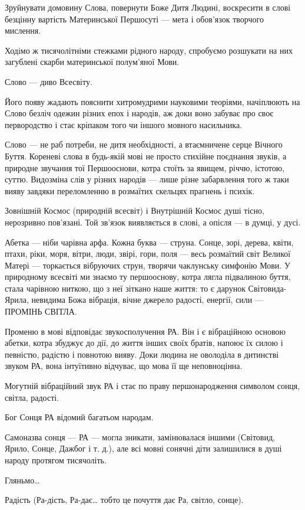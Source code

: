 Зруйнувати домовину Слова, повернути Боже Дитя Людині, воскресити в слові
безцінну вартість Материнської Першосуті — мета і обов’язок творчого мислення.

Ходімо ж тисячолітніми стежками рідного народу, спробуємо розшукати на них
загублені скарби материнської полум’яної Мови.

Слово — диво Всесвіту.

Його появу жадають пояснити хитромудрими науковими теоріями, начіплюють на
Слово безліч одежин різних епох і народів, аж доки воно забуває про своє
первородство і стає кріпаком того чи іншого мовного насильника.

Слово — не раб потреби, не дитя необхідності, а втаємничене серце Вічного
Буття. Кореневі слова в будь-якій мові не просто стихійне поєднання звуків, а
природне звучання тої Першооснови, котра стоїть за явищем, річчю, істотою,
суттю. Видозміна слів у різних народів — лише різне забарвлення того ж таки
вияву завдяки переломленню в розмаїтих скельцях прагнень і психік.

Зовнішній Космос (природній всесвіт) і Внутрішній Космос душі тісно, нерозривно
пов’язані. Той зв’язок виявляється в слові, а опісля — в думці, у дусі.

Абетка — ніби чарівна арфа. Кожна буква — струна. Сонце, зорі, дерева, квіти,
птахи, ріки, моря, вітри, люди, звірі, гори, поля — весь розмаїтий світ Великої
Матері — торкається вібруючих струн, творячи чаклунську симфонію Мови. У
природному всесвіті ми знаємо ту першооснову, котра лягла підвалиною буття,
стала чарівною ниткою, що з неї зіткано наше життя: то є дарунок
Світовида-Ярила, невидима Божа вібрація, вічне джерело радості, енергії, сили —
ПРОМІНЬ СВІТЛА.

Променю в мові відповідає звукосполучення РА. Він і є вібраційною основою
абетки, котра збуджує до дії, до життя інших своїх братів, напоює їх силою і
певністю, радістю і повнотою вияву. Доки людина не оволоділа в дитинстві звуком
РА, вона інтуїтивно відчуває, що мова її ще неповноцінна.

Могутній вібраційний звук РА і стає по праву першонародження символом сонця,
світла, радості.

Бог Сонця РА відомий багатьом народам.

Самоназва сонця — РА — могла зникати, замінювалася іншими (Світовид, Ярило,
Сонце, Дажбог і т. д.), але всі мовні сонячні діти залишилися в душі народу
протягом тисячоліть.

Гляньмо…

Радість (Ра-дість, Ра-дає… тобто це почуття дає Ра, світло, сонце).

